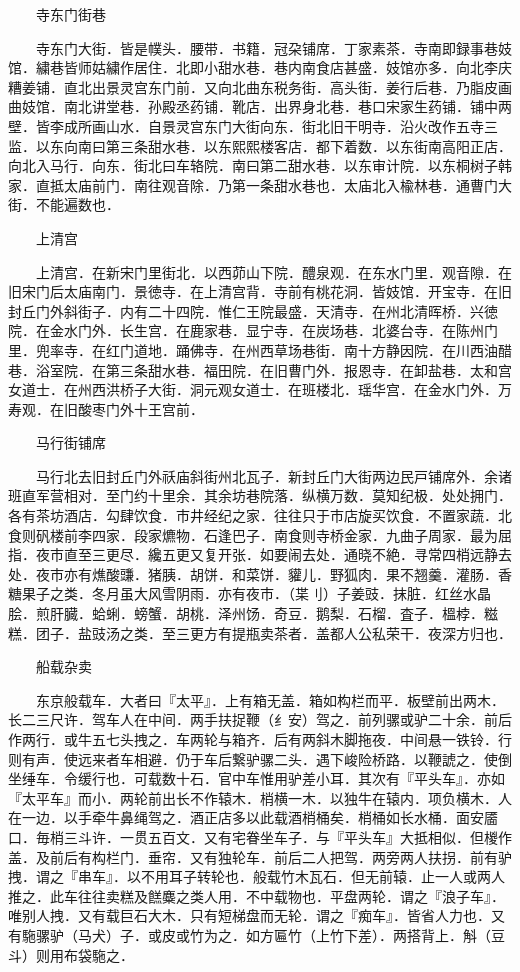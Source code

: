 　　寺东门街巷

　　寺东门大街．皆是幞头．腰带．书籍．冠朶铺席．丁家素茶．寺南即録事巷妓馆．繍巷皆师姑繍作居住．北即小甜水巷．巷内南食店甚盛．妓馆亦多．向北李庆糟姜铺．直北出景灵宫东门前．又向北曲东税务街．高头街．姜行后巷．乃脂皮画曲妓馆．南北讲堂巷．孙殿丞药铺．靴店．出界身北巷．巷口宋家生药铺．铺中两壁．皆李成所画山水．自景灵宫东门大街向东．街北旧干明寺．沿火改作五寺三监．以东向南曰第三条甜水巷．以东熙熙楼客店．都下着数．以东街南高阳正店．向北入马行．向东．街北曰车辂院．南曰第二甜水巷．以东审计院．以东桐树子韩家．直抵太庙前门．南往观音除．乃第一条甜水巷也．太庙北入楡林巷．通曹门大街．不能遍数也．

　　上清宫

　　上清宫．在新宋门里街北．以西茆山下院．醴泉观．在东水门里．观音隙．在旧宋门后太庙南门．景徳寺．在上清宫背．寺前有桃花洞．皆妓馆．开宝寺．在旧封丘门外斜街子．内有二十四院．惟仁王院最盛．天清寺．在州北清晖桥．兴徳院．在金水门外．长生宫．在鹿家巷．显宁寺．在炭场巷．北婆台寺．在陈州门里．兜率寺．在红门道地．踊佛寺．在州西草场巷街．南十方静因院．在川西油醋巷．浴室院．在第三条甜水巷．福田院．在旧曹门外．报恩寺．在卸盐巷．太和宫女道士．在州西洪桥子大街．洞元观女道士．在班楼北．瑶华宫．在金水门外．万寿观．在旧酸枣门外十王宫前．

　　马行街铺席

　　马行北去旧封丘门外祅庙斜街州北瓦子．新封丘门大街两边民戸铺席外．余诸班直军营相对．至门约十里余．其余坊巷院落．纵横万数．莫知纪极．处处拥门．各有茶坊酒店．勾肆饮食．市井经纪之家．往往只于市店旋买饮食．不置家蔬．北食则矾楼前李四家．段家爊物．石逢巴子．南食则寺桥金家．九曲子周家．最为屈指．夜市直至三更尽．纔五更又复开张．如要闹去处．通晓不絶．寻常四梢远静去处．夜市亦有燋酸豏．猪胰．胡饼．和菜饼．貛儿．野狐肉．果不翘羹．灌肠．香糖果子之类．冬月虽大风雪阴雨．亦有夜市．（枼刂）子姜豉．抹脏．红丝水晶脍．煎肝臓．蛤蜊．螃蟹．胡桃．泽州饧．奇豆．鹅梨．石榴．査子．榲桲．糍糕．团子．盐豉汤之类．至三更方有提瓶卖茶者．盖都人公私荣干．夜深方归也．

　　船载杂卖

　　东京般载车．大者曰『太平』．上有箱无盖．箱如构栏而平．板壁前出两木．长二三尺许．驾车人在中间．两手扶捉鞭（纟安）驾之．前列骡或驴二十余．前后作两行．或牛五七头拽之．车两轮与箱齐．后有两斜木脚拖夜．中间悬一铁铃．行则有声．使远来者车相避．仍于车后繋驴骡二头．遇下峻险桥路．以鞭諕之．使倒坐缍车．令缓行也．可载数十石．官中车惟用驴差小耳．其次有『平头车』．亦如『太平车』而小．两轮前出长不作辕木．梢横一木．以独牛在辕内．项负横木．人在一边．以手牵牛鼻绳驾之．酒正店多以此载酒梢桶矣．梢桶如长水桶．面安靥口．毎梢三斗许．一贯五百文．又有宅眷坐车子．与『平头车』大抵相似．但椶作盖．及前后有构栏门．垂帘．又有独轮车．前后二人把驾．两旁两人扶拐．前有驴拽．谓之『串车』．以不用耳子转轮也．般载竹木瓦石．但无前辕．止一人或两人推之．此车往往卖糕及餻麋之类人用．不中载物也．平盘两轮．谓之『浪子车』．唯别人拽．又有载巨石大木．只有短梯盘而无轮．谓之『痴车』．皆省人力也．又有駞骡驴（马犬）子．或皮或竹为之．如方匾竹（上竹下差）．两搭背上．斛（豆斗）则用布袋駞之．

